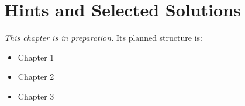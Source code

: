 
\chapter{Hints and Selected Solutions}
\label{ch:appE}

\noindent\textit{This chapter is in preparation.} Its planned structure is:

\begin{itemize}
  \item Chapter 1
  \item Chapter 2
  \item Chapter 3
\end{itemize}
